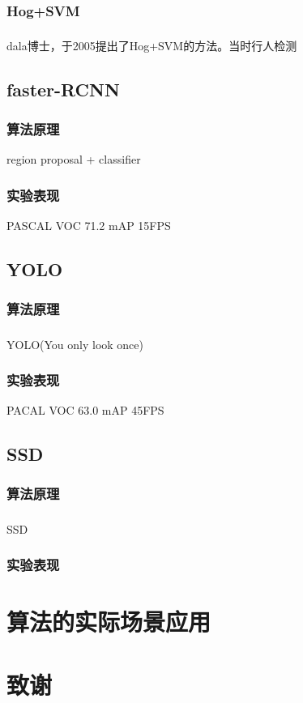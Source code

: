 \documentclass[12pt,a4paper,titlepage]{article}
\newcommand{\upcite}[1]{\textsuperscript{\textsuperscript{\cite{#1}}}}  %
\begin{document}
\subsubsection{Hog+SVM}
dala博士，于2005提出了Hog+SVM的方法\upcite{dalal2005histograms}。当时行人检测
\subsection{faster-RCNN}
\subsubsection{算法原理}
region proposal + classifier
\subsubsection{实验表现}
PASCAL VOC 71.2 mAP   15FPS
\subsection{YOLO}
\subsubsection{算法原理}
YOLO(You only look once)\upcite{redmon2016you}
\subsubsection{实验表现}
PACAL VOC 63.0 mAP    45FPS
\subsection{SSD}
\subsubsection{算法原理}
SSD\upcite{liu2016ssd}
\subsubsection{实验表现}


\section{算法的实际场景应用}

\section*{致谢}


\newpage
\renewcommand\refname{\zihao{-2} 参考文献}

\end{document}
